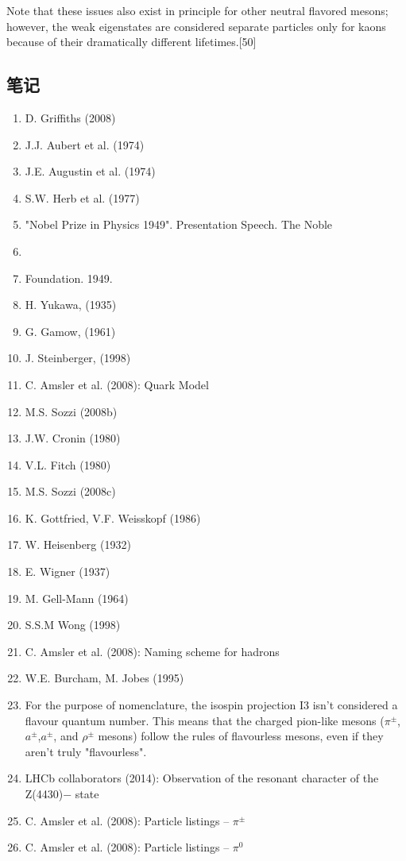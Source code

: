 Note that these issues also exist in principle for other neutral flavored mesons; however, the weak eigenstates are considered separate particles only for kaons because of their dramatically different lifetimes.[50]
\subsection{笔记}
\begin{enumerate}
\item D. Griffiths (2008)
\item J.J. Aubert et al. (1974)
\item J.E. Augustin et al. (1974)
\item S.W. Herb et al. (1977)
\item "Nobel Prize in Physics 1949". Presentation Speech. The Noble \item \item Foundation. 1949.
\item H. Yukawa, (1935)
\item G. Gamow, (1961)
\item J. Steinberger, (1998)
\item C. Amsler et al. (2008): Quark Model
\item M.S. Sozzi (2008b)
\item J.W. Cronin (1980)
\item V.L. Fitch (1980)
\item M.S. Sozzi (2008c)
\item K. Gottfried, V.F. Weisskopf (1986)
\item W. Heisenberg (1932)
\item E. Wigner (1937)
\item M. Gell-Mann (1964)
\item S.S.M Wong (1998)
\item C. Amsler et al. (2008): Naming scheme for hadrons
\item W.E. Burcham, M. Jobes (1995)
\item For the purpose of nomenclature, the isospin projection I3 isn't considered a flavour quantum number. This means that the charged pion-like mesons ($\pi^\pm$,$a^\pm$,$a^\pm$, and $\rho^\pm$ mesons) follow the rules of flavourless mesons, even if they aren't truly "flavourless".
\item LHCb collaborators (2014): Observation of the resonant character of the Z(4430)− state
\item C. Amsler et al. (2008): Particle listings – $\pi^\pm$
\item C. Amsler et al. (2008): Particle listings – $\pi^0$

\end{enumerate}
